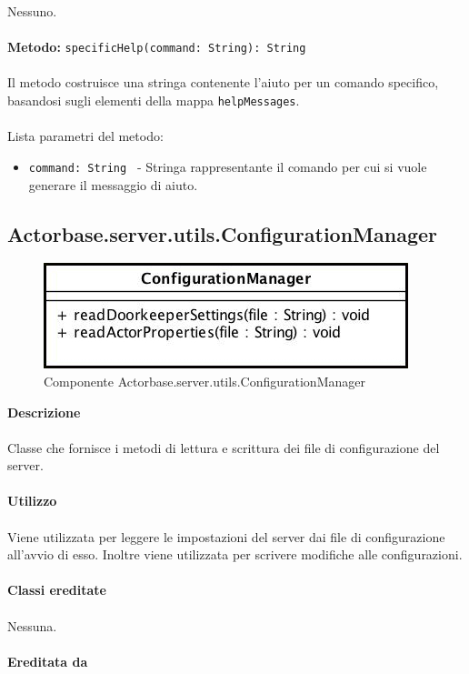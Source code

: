 \documentclass[a4paper]{article}
\begin{document}
			Nessuno.
			\\ \\
		\textbf{Metodo: }\texttt{specificHelp(command: String): String}
			\\ \\
			Il metodo costruisce una stringa contenente l'aiuto per un comando specifico, basandosi sugli elementi della mappa \texttt{helpMessages}.
			\\ \\
			Lista parametri del metodo:
			\begin{itemize}
				\item \texttt{command: String } - Stringa rappresentante il comando per cui si vuole generare il messaggio di aiuto.
			\end{itemize}
			
	\subsection{Actorbase.server.utils.ConfigurationManager}
		\begin{figure}[H]
			\centering
			\includegraphics[scale = 0.6]{Server/confManClass.jpg}
			\caption{Componente Actorbase.server.utils.ConfigurationManager}
		\end{figure}
		\textbf{Descrizione}
			\\ \\
			Classe che fornisce i metodi di lettura e scrittura dei file di configurazione del server.
			\\ \\
		\textbf{Utilizzo}
			\\ \\
			Viene utilizzata per leggere le impostazioni del server dai file di configurazione all'avvio di esso. Inoltre viene utilizzata per scrivere modifiche alle configurazioni.
			\\ \\
		\textbf{Classi ereditate}
			\\ \\
			Nessuna.
			\\ \\
		\textbf{Ereditata da}
			\\ \\
\end{document}
